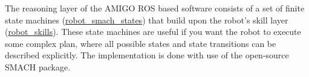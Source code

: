 The reasoning layer of the AMIGO ROS based software consists of a set of finite state machines (\href{https://github.com/tue-robotics/robot_smach_states}{robot\_smach\_states}) that build upon the robot’s skill layer (\href{https://github.com/tue-robotics/robot_skills}{robot\_skills}). These state machines are useful if you want the robot to execute some complex plan, where all possible states and state transitions can be described explicitly. The implementation is done with use of the open-source SMACH package. %